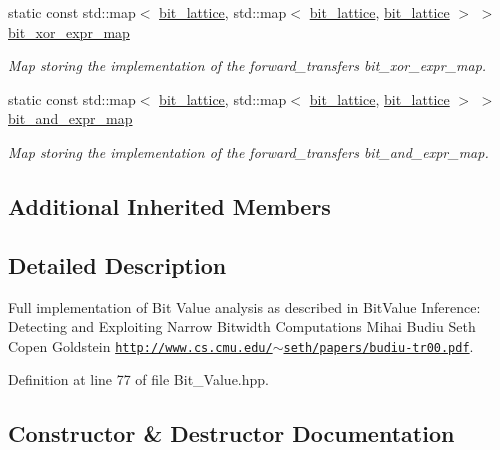 \begin{DoxyCompactItemize}
static const std\+::map$<$ \hyperlink{bit__lattice_8hpp_ab732360111c810c4eaeb4c8b81d160d6}{bit\+\_\+lattice}, std\+::map$<$ \hyperlink{bit__lattice_8hpp_ab732360111c810c4eaeb4c8b81d160d6}{bit\+\_\+lattice}, \hyperlink{bit__lattice_8hpp_ab732360111c810c4eaeb4c8b81d160d6}{bit\+\_\+lattice} $>$ $>$ \hyperlink{classBit__Value_aa5fbce787906cfea58af464a5db01721}{bit\+\_\+xor\+\_\+expr\+\_\+map}
\begin{DoxyCompactList}\small\item\em Map storing the implementation of the forward\+\_\+transfer\textquotesingle{}s bit\+\_\+xor\+\_\+expr\+\_\+map. \end{DoxyCompactList}\item 
static const std\+::map$<$ \hyperlink{bit__lattice_8hpp_ab732360111c810c4eaeb4c8b81d160d6}{bit\+\_\+lattice}, std\+::map$<$ \hyperlink{bit__lattice_8hpp_ab732360111c810c4eaeb4c8b81d160d6}{bit\+\_\+lattice}, \hyperlink{bit__lattice_8hpp_ab732360111c810c4eaeb4c8b81d160d6}{bit\+\_\+lattice} $>$ $>$ \hyperlink{classBit__Value_a269f2f5c0db02d71e3f940c98b5b36e6}{bit\+\_\+and\+\_\+expr\+\_\+map}
\begin{DoxyCompactList}\small\item\em Map storing the implementation of the forward\+\_\+transfer\textquotesingle{}s bit\+\_\+and\+\_\+expr\+\_\+map. \end{DoxyCompactList}\end{DoxyCompactItemize}
\subsection*{Additional Inherited Members}


\subsection{Detailed Description}
Full implementation of Bit Value analysis as described in Bit\+Value Inference\+: Detecting and Exploiting Narrow Bitwidth Computations Mihai Budiu Seth Copen Goldstein \href{http://www.cs.cmu.edu/~seth/papers/budiu-tr00.pdf}{\tt http\+://www.\+cs.\+cmu.\+edu/$\sim$seth/papers/budiu-\/tr00.\+pdf}. 

Definition at line 77 of file Bit\+\_\+\+Value.\+hpp.



\subsection{Constructor \& Destructor Documentation}
\mbox{\label{classBit__Value_a81d98acfc22db158a1955ca04bdf3fb8}} 
